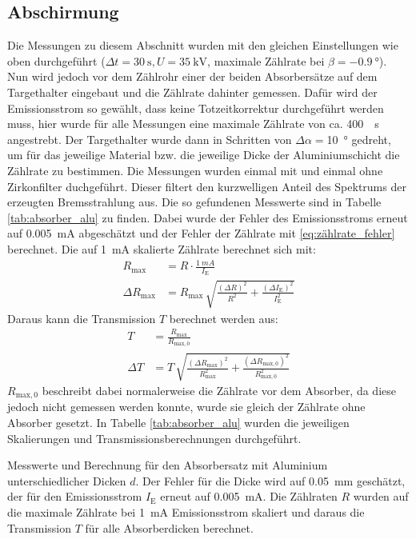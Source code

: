 \documentclass[11pt, a4paper]{article}
\numberwithin{equation}{section}
\begin{document}
\subsection{Abschirmung}

Die Messungen zu diesem Abschnitt wurden mit den gleichen Einstellungen wie oben durchgeführt ($\Delta t=\SI{30}{\second}, U=\SI{35}{\kilo\volt}$, maximale Zählrate bei $\beta=\SI{-0.9}{\degree}$).
Nun wird jedoch vor dem Zählrohr einer der beiden Absorbersätze auf dem Targethalter eingebaut und die Zählrate dahinter gemessen.
Dafür wird der Emissionsstrom so gewählt, dass keine Totzeitkorrektur durchgeführt werden muss, hier wurde für alle Messungen eine maximale Zählrate von ca. \SI{400}{\per\second} angestrebt.
Der Targethalter wurde dann in Schritten von $\Delta\alpha=$\SI{10}{\degree} gedreht, um für das jeweilige Material bzw. die jeweilige Dicke der Aluminiumschicht die Zählrate zu bestimmen.
Die Messungen wurden einmal mit und einmal ohne Zirkonfilter duchgeführt.
Dieser filtert den kurzwelligen Anteil des Spektrums der erzeugten Bremsstrahlung aus.
Die so gefundenen Messwerte sind in Tabelle \ref{tab:absorber_alu} zu finden.
Dabei wurde der Fehler des Emissionsstroms erneut auf \SI{0.005}{\milli\ampere} abgeschätzt und der Fehler der Zählrate mit \eqref{eq:zählrate_fehler} berechnet.
Die auf \SI{1}{mA} skalierte Zählrate berechnet sich mit:
\begin{align}
	R_\mathrm{max} &= R\cdot\frac{\SI{1}{mA}}{I_\mathrm{E}} \label{eq:max_rate}\\
	\Delta R_\mathrm{max} &= R_\mathrm{max} \, \sqrt{\frac{(\Delta R)^2}{R^2} + \frac{(\Delta I_\mathrm{E})^2}{I_\mathrm{E}^2}}
\end{align}
Daraus kann die Transmission $T$ berechnet werden aus:
\begin{align}
	T &= \frac{R_\mathrm{max}}{R_\mathrm{max, 0}}\\
	\Delta T &= T \, \sqrt{\frac{(\Delta R_\mathrm{max})^2}{R_\mathrm{max}^2} + \frac{(\Delta R_\mathrm{max, 0})^2}{R_\mathrm{max, 0}^2}} 
	\label{eq:transmission}
\end{align}
$R_\mathrm{max, 0}$ beschreibt dabei normalerweise die Zählrate vor dem Absorber, da diese jedoch nicht gemessen werden konnte, wurde sie gleich der Zählrate ohne Absorber gesetzt.
In Tabelle \ref{tab:absorber_alu} wurden die jeweiligen Skalierungen und Transmissionsberechnungen durchgeführt.
\begin{table}[ht]
	\centering
	\resizebox{\textwidth}{!}{
		}
	\caption{Messwerte und Berechnung für den Absorbersatz mit Aluminium unterschiedlicher Dicken $d$. Der Fehler für die Dicke wird auf \SI{0.05}{mm} geschätzt, der für den Emissionsstrom $I_\mathrm{E}$ erneut auf \SI{0.005}{mA}.
		Die Zählraten $R$ wurden auf die maximale Zählrate bei \SI{1}{mA} Emissionsstrom skaliert und daraus die Transmission $T$ für alle Absorberdicken berechnet.}
	\label{tab:absorber_alu}
\end{table}
\end{document}
